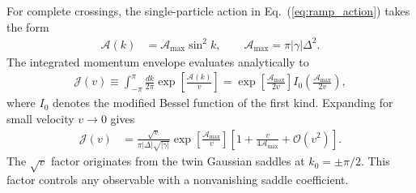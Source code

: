 \documentclass[aps,prb,reprint,superscriptaddress,amsmath,amssymb,floatfix]{revtex4-2}
\begin{document}
  For complete crossings, the single-particle action in Eq.~(\ref{eq:ramp_action}) takes the form
\begin{equation}
\begin{aligned}
\mathcal A(k) &= \mathcal A_{\max}\sin^2 k, \qquad \mathcal A_{\max} = \pi|\gamma|\Delta^2 .
\end{aligned} \label{eq:app_action_compact}
\end{equation}
The integrated momentum envelope evaluates analytically to
\begin{equation}
\begin{aligned}
\mathcal J(v) \equiv \int_{-\pi}^{\pi} \frac{dk}{2\pi} \exp\!\left[ \frac{\mathcal A(k)}{v} \right] = \exp\!\left[ \frac{\mathcal A_{\max}}{2v} \right] I_0\!\left( \frac{\mathcal A_{\max}}{2v} \right),
\end{aligned} \label{eq:app_Bessel_exact}
\end{equation}
where $I_0$ denotes the modified Bessel function of the first kind. Expanding for small velocity $v\to0$ gives
\begin{equation}
\begin{aligned}
\mathcal J(v) &= \frac{\sqrt v} {\pi|\Delta|\sqrt{|\gamma|}} \exp\!\left[ \frac{\mathcal A_{\max}}{v} \right] \left[ 1+ \frac{v}{4\mathcal A_{\max}} + \mathcal O(v^2) \right]. \end{aligned}
\label{eq:app_Bessel_asymptotic}
\end{equation}
The $\sqrt v$ factor originates from the twin Gaussian saddles at $k_0=\pm\pi/2$. This factor controls any observable with a nonvanishing saddle coefficient.
\end{document}
